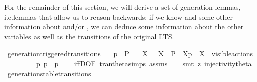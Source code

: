 \begin{isabellebody}
\begin{isamarkuptext}
For the remainder of this section, we will derive a set of generation lemmas, i.e.\@ lemmas that allow us to reason backwards: if we know  and some other information about  and/or \isa{{\isasymalpha}}, we can deduce some information about the other variables as well as the transitions of the original LTS.%
\end{isamarkuptext}\isamarkuptrue%
\isamarkupfalse%
\ generation{\isacharunderscore}{\kern0pt}triggered{\isacharunderscore}{\kern0pt}transitions{\isacharcolon}{\kern0pt}\isanewline
\ \ \ {\isacartoucheopen}{\isasymtheta}{\isacharparenleft}{\kern0pt}p{\isacharparenright}{\kern0pt}\ {\isasymlongmapsto}\isactrlsup {\isasymtheta}{\isasymalpha}\ P{\isacharprime}{\kern0pt}{\isacartoucheclose}\isanewline
\ \ \ {\isacartoucheopen}{\isacharparenleft}{\kern0pt}{\isasymexists}X{\isachardot}{\kern0pt}\ {\isasymalpha}\ {\isacharequal}{\kern0pt}\ {\isasymepsilon}{\isacharbrackleft}{\kern0pt}X{\isacharbrackright}{\kern0pt}\ {\isasymand}\ P{\isacharprime}{\kern0pt}\ {\isacharequal}{\kern0pt}\ {\isasymtheta}{\isacharbrackleft}{\kern0pt}X{\isacharbrackright}{\kern0pt}{\isacharparenleft}{\kern0pt}p{\isacharparenright}{\kern0pt}\ {\isasymand}\ X\ {\isasymsubseteq}\ visible{\isacharunderscore}{\kern0pt}actions{\isacharparenright}{\kern0pt}\ \isanewline
\ \ \ \ {\isasymor}\ {\isacharparenleft}{\kern0pt}{\isasymalpha}\ {\isacharequal}{\kern0pt}\ {\isasymtau}\ {\isasymand}\ {\isacharparenleft}{\kern0pt}{\isasymexists}p{\isacharprime}{\kern0pt}{\isachardot}{\kern0pt}\ p\ {\isasymlongmapsto}{\isasymtau}\ p{\isacharprime}{\kern0pt}{\isacharparenright}{\kern0pt}{\isacharparenright}{\kern0pt}{\isacartoucheclose}\isanewline
%
\isadelimproof
\ \ %
\endisadelimproof
%
\isatagproof
{}\isamarkupfalse%
\ iffD{}{\isacharbrackleft}{\kern0pt}OF\ tran{\isacharunderscore}{\kern0pt}theta{\isachardot}{\kern0pt}simps\ assms{\isacharbrackright}{\kern0pt}\isanewline
\ \ \isamarkupfalse%
\ {\isacharparenleft}{\kern0pt}smt\ {\isacharparenleft}{\kern0pt}z{}{\isacharparenright}{\kern0pt}\ injectivity{\isacharunderscore}{\kern0pt}theta{\isacharparenleft}{\kern0pt}{}{\isacharcomma}{\kern0pt}{}{\isacharparenright}{\kern0pt}{\isacharparenright}{\kern0pt}%
\endisatagproof
{\isafoldproof}%
%
\isadelimproof
\isanewline
%
\endisadelimproof
\isanewline
{}\isamarkupfalse%
\ generation{\isacharunderscore}{\kern0pt}stable{\isacharunderscore}{\kern0pt}transitions{\isacharcolon}{\kern0pt}\isanewline

\end{isabellebody}
